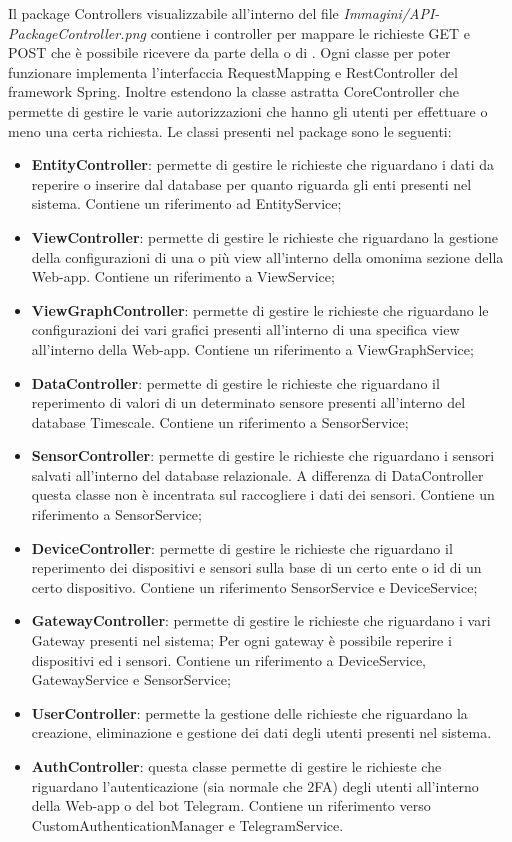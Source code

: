 		Il package Controllers visualizzabile all'interno del file \textit{Immagini/API-PackageController.png} contiene i controller per mappare le richieste GET e POST che è possibile ricevere da parte della  o di .
		\newline
		Ogni classe per poter funzionare implementa l'interfaccia RequestMapping e RestController del framework Spring. Inoltre estendono la classe astratta CoreController che permette di gestire le varie autorizzazioni che hanno gli utenti per effettuare o meno una certa richiesta.
		Le classi presenti nel package sono le seguenti:
		\begin{itemize}
			\item \textbf{EntityController}: permette di gestire le richieste che riguardano i dati da reperire o inserire dal database per quanto riguarda gli enti presenti nel sistema. Contiene un riferimento ad EntityService;
			\item \textbf{ViewController}: permette di gestire le richieste che riguardano la gestione della configurazioni di una o più view all'interno della omonima sezione della Web-app. Contiene un riferimento a ViewService;
			\item \textbf{ViewGraphController}: permette di gestire le richieste che riguardano le configurazioni dei vari grafici presenti all'interno di una specifica view all'interno della Web-app. Contiene un riferimento a ViewGraphService;
			\item \textbf{DataController}: permette di gestire le richieste che riguardano il reperimento di valori di un determinato sensore presenti all'interno del database Timescale. Contiene un riferimento a SensorService;
			\item \textbf{SensorController}: permette di gestire le richieste che riguardano i sensori salvati all'interno del database relazionale. A differenza di DataController questa classe non è incentrata sul raccogliere i dati dei sensori. Contiene un riferimento a SensorService;
			\item \textbf{DeviceController}: permette di gestire le richieste che riguardano il reperimento dei dispositivi e sensori sulla base di un certo ente o id di un certo dispositivo. Contiene un riferimento SensorService e DeviceService;
			\item \textbf{GatewayController}: permette di gestire le richieste che riguardano i vari Gateway presenti nel sistema; Per ogni gateway è possibile reperire i dispositivi ed i sensori. Contiene un riferimento a DeviceService, GatewayService e SensorService;
			\item \textbf{UserController}: permette la gestione delle richieste che riguardano la creazione, eliminazione e gestione dei dati degli utenti presenti nel sistema.  
			\item \textbf{AuthController}: questa classe permette di gestire le richieste che riguardano l'autenticazione (sia normale che 2FA) degli utenti all'interno della Web-app o del bot Telegram. Contiene un riferimento verso CustomAuthenticationManager e TelegramService.  
		\end{itemize}
